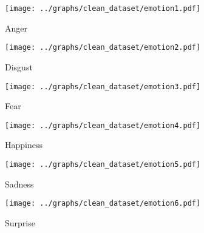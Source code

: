 \begin{figure}[!ht]
\center
	\caption{Anger}  
	\texttt{[image: ../graphs/clean\_dataset/emotion1.pdf]}
	 
	
   \label{fig:decisionTrees1}
\end{figure}

\begin{figure}[!ht]
\center
	\caption{Disgust}  
	\texttt{[image: ../graphs/clean\_dataset/emotion2.pdf]}
	 
	
   \label{fig:decisionTrees2}
\end{figure}

\begin{figure}[!ht]
\center
	\caption{Fear}  
	\texttt{[image: ../graphs/clean\_dataset/emotion3.pdf]}
	 
	
   \label{fig:decisionTrees3}
\end{figure}

\begin{figure}[!ht]
\center
	\caption{Happiness}  
	\texttt{[image: ../graphs/clean\_dataset/emotion4.pdf]}
	 
	
   \label{fig:decisionTrees4}
\end{figure}

\begin{figure}[!ht]
\center
	\caption{Sadness}  
	\texttt{[image: ../graphs/clean\_dataset/emotion5.pdf]}
	 
	
   \label{fig:decisionTrees5}
\end{figure}

\begin{figure}[!ht]
\center
	\caption{Surprise}  
	\texttt{[image: ../graphs/clean\_dataset/emotion6.pdf]}
	 
	
   \label{fig:decisionTrees6}
\end{figure}
